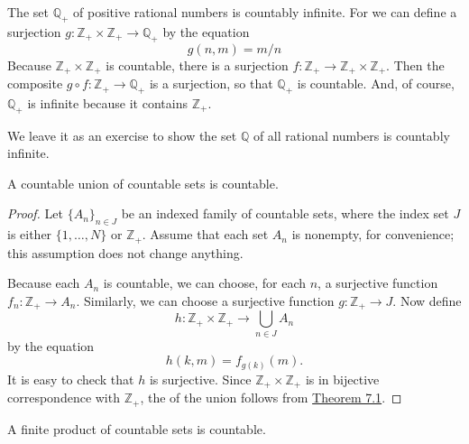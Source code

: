 \begin{centeredblock}
 \begin{example}
\label{ex:\thesection.\theexample}
 The set \(\mathbb{Q}_{+}\) of positive rational numbers is countably infinite. For we can define a surjection \(g \colon {\mathbb{Z}}_{+} \times {\mathbb{Z}}_{+} \rightarrow {\mathbb{Q}}_{+}\) by the equation
 \[
 g({n,m}) = m/n
 \]
 Because \(\mathbb{Z}_{+} \times {\mathbb{Z}}_{+}\) is countable, there is a surjection \(f : \mathbb{Z}_{+} \rightarrow {\mathbb{Z}}_{+} \times {\mathbb{Z}}_{+}\). Then the composite \(g \circ f : \mathbb{Z}_{+} \rightarrow {\mathbb{Q}}_{+}\) is a surjection, so that \(\mathbb{Q}_{+}\) is countable. And, of course, \(\mathbb{Q}_{+}\) is infinite because it contains \(\mathbb{Z}_{+}\).
 
 We leave it as an exercise to show the set \(\mathbb{Q}\) of all rational numbers is countably infinite.
 \end{example}
\end{centeredblock}

\begin{theorem}
\label{thm:\thetheorem}
 A countable union of countable sets is countable.
\end{theorem}

\begin{proof}
 Let \({\{ A_{n}\} }_{n \in J}\) be an indexed family of countable sets, where the index set \(J\) is either \(\{1,\ldots, N\}\) or \(\mathbb{Z}_{+}\). Assume that each set \(A_{n}\) is nonempty, for convenience; this assumption does not change anything.

 Because each \(A_{n}\) is countable, we can choose, for each \(n\), a surjective function \(f_{n} : \mathbb{Z}_{+} \rightarrow {A}_{n}\). Similarly, we can choose a surjective function \(g : \mathbb{Z}_{+} \rightarrow J\). Now define
 \[
 h : \mathbb{Z}_{+} \times {\mathbb{Z}}_{+} \rightarrow \mathop{\bigcup }\limits_{{n \in J}}A_{n}
 \]
 by the equation
 \[
 h({k,m}) = f_{g( k) }( m).
 \]
 It is easy to check that \(h\) is surjective. Since \(\mathbb{Z}_{+} \times {\mathbb{Z}}_{+}\) is in bijective correspondence with \(\mathbb{Z}_{+}\), the  of the union follows from \hyperref[thm:7.1]{Theorem 7.1}.
\end{proof}

\begin{theorem}
\label{thm:\thetheorem}
 A finite product of countable sets is countable.
\end{theorem}

